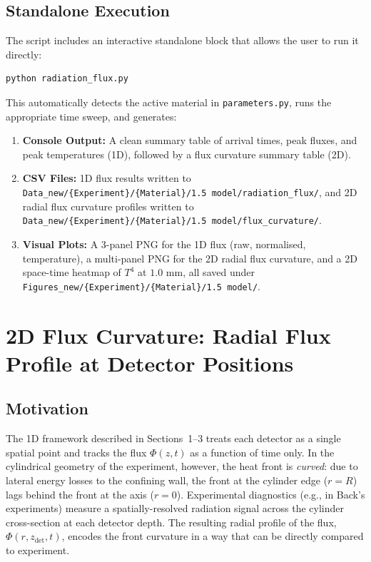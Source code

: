 \documentclass{article}
\begin{document}
\subsection{Standalone Execution}
The script includes an interactive standalone block that allows the user to run it directly:
\begin{verbatim}
python radiation_flux.py
\end{verbatim}
This automatically detects the active material in \texttt{parameters.py}, runs the appropriate time sweep, and generates:
\begin{enumerate}
    \item \textbf{Console Output:} A clean summary table of arrival times, peak fluxes, and peak temperatures (1D), followed by a flux curvature summary table (2D).
    \item \textbf{CSV Files:} 1D flux results written to \texttt{Data\_new/\{Experiment\}/\{Material\}/1.5 model/radiation\_flux/}, and 2D radial flux curvature profiles written to \texttt{Data\_new/\{Experiment\}/\{Material\}/1.5 model/flux\_curvature/}.
    \item \textbf{Visual Plots:} A 3-panel PNG for the 1D flux (raw, normalised, temperature), a multi-panel PNG for the 2D radial flux curvature, and a 2D space-time heatmap of $T^4$ at $1.0\text{ mm}$, all saved under \texttt{Figures\_new/\{Experiment\}/\{Material\}/1.5 model/}.
\end{enumerate}


\section{2D Flux Curvature: Radial Flux Profile at Detector Positions}

\subsection{Motivation}
The 1D framework described in Sections~1--3 treats each detector as a single spatial point and tracks the flux $\Phi(z, t)$ as a function of time only. In the cylindrical geometry of the experiment, however, the heat front is \emph{curved}: due to lateral energy losses to the confining wall, the front at the cylinder edge ($r = R$) lags behind the front at the axis ($r = 0$). Experimental diagnostics (e.g., in Back's experiments) measure a spatially-resolved radiation signal across the cylinder cross-section at each detector depth. The resulting radial profile of the flux, $\Phi(r, z_{\text{det}}, t)$, encodes the front curvature in a way that can be directly compared to experiment.
\end{document}
